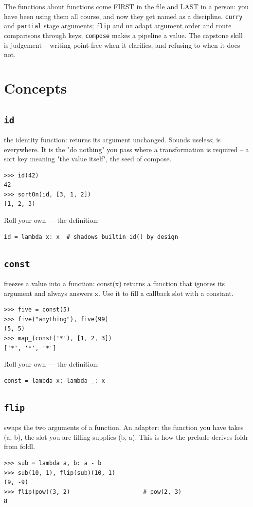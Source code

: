 \documentclass[10pt,letterpaper]{book}
\begin{document}
The functions about functions come FIRST in the file and LAST in a person:
you have been using them all course, and now they get named as a
discipline. \texttt{curry} and \texttt{partial} stage arguments;
\texttt{flip} and \texttt{on} adapt argument order and route comparisons
through keys; \texttt{compose} makes a pipeline a value. The capstone skill
is judgement -- writing point-free when it clarifies, and refusing to when
it does not.
\section{Concepts}
\subsection{\texttt{id}}\label{def:id}
the identity function: returns its argument unchanged. Sounds useless; is everywhere. It is the "do nothing" you pass where a transformation is required -- a sort key meaning "the value itself", the seed of compose.
\begin{lstlisting}[style=ex]
>>> id(42)
42
>>> sortOn(id, [3, 1, 2])
[1, 2, 3]
\end{lstlisting}

Roll your own --- the definition:

\begin{lstlisting}[style=ex]
id = lambda x: x  # shadows builtin id() by design
\end{lstlisting}
\subsection{\texttt{const}}\label{def:const}
freezes a value into a function: const(x) returns a function that ignores its argument and always answers x. Use it to fill a callback slot with a constant.
\begin{lstlisting}[style=ex]
>>> five = const(5)
>>> five("anything"), five(99)
(5, 5)
>>> map_(const('*'), [1, 2, 3])
['*', '*', '*']
\end{lstlisting}

Roll your own --- the definition:

\begin{lstlisting}[style=ex]
const = lambda x: lambda _: x
\end{lstlisting}
\subsection{\texttt{flip}}\label{def:flip}
swaps the two arguments of a function. An adapter: the function you have takes (a, b), the slot you are filling supplies (b, a). This is how the prelude derives foldr from foldl.
\begin{lstlisting}[style=ex]
>>> sub = lambda a, b: a - b
>>> sub(10, 1), flip(sub)(10, 1)
(9, -9)
>>> flip(pow)(3, 2)                     # pow(2, 3)
8
\end{lstlisting}
\end{document}

